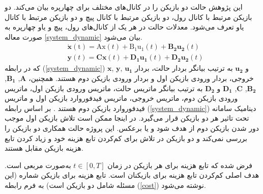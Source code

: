 \documentclass{CCI2020}
\begin{document}
این پژوهش حالت دو بازیکن را  در کانال‌های مختلف برای چهارپره بیان می‌کند. دو بازیکن مرتبط با کانال رول، دو بازیکن مرتبط با کانال پیچ و دو بازیکن مرتبط با کانال یاو تعرف می‌شود. معدلات حالت در هر یک از کانال‌های رول، پیچ و یاو چهارپره به صورت معاله \eqref{system_dynamic} بیان می‌شود.
\begin{equation}\label{system_dynamic}
	\begin{split}
		&\mathrm{\boldsymbol{\dot x}(t)} = \boldsymbol{\mathrm{Ax}}(t) + \boldsymbol{\mathrm{B_1u_1}}(t) + \boldsymbol{B_2u_2}(t) %
		\\
		&\boldsymbol{y}(t) = \boldsymbol{Cx}(t) + \boldsymbol{D_1u_1}(t) + \boldsymbol{D_2u_2}(t)
	\end{split}
\end{equation}
که در رابطه (\ref{system_dynamic})
$\boldsymbol x$, $\boldsymbol y$, $\boldsymbol{u_1}$
و
$\boldsymbol{u_2}$
به ترتیب بیانگر بردار حالت، بردار خروجی، بردار ورودی بازیکن اول و بردار ورودی بازیکن دوم هستند. همچنین، 
$\boldsymbol A$, $\boldsymbol{B_1}$, $\boldsymbol {B_2}$, $\boldsymbol C$, $\boldsymbol {D_1}$
و
$\boldsymbol{D_2}$
به ترتیب بیانگر ماتریس حالت، ماتریس ورودی بازیکن اول، ماتریس ورودی بازیکن دوم، ماتریس خروجی، ماتریس فیدفوروارد بازیکن اول و ماتریس فیدفوروارد بازیکن دوم هستند
\cite{mct}.
بر اساس رابطه (\ref{system_dynamic}) دینامیک سامانه تحت تاثیر هر دو بازیکن قرار می‌گیرد. در اینجا ممکن است تلاش  بازیکن اول موجب دور شدن بازیکن دوم از هدف شود و یا برعکس.  این پروژه حالت همکاری دو بازیکن را بررسی نمی‌کند و دو بازیکن در تلاش برای کم‌کردن تابع هزینه خود و زیاد کردن تابع هزینه بازیکن مقابل هستند.


فرض شده  که تابع هزینه برای هر بازیکن در زمان $t \in [0, T]$ به‌صورت مربعی است.
هدف اصلی کم‌کردن تابع هزینه برای بازیکنان است. تابع هزینه برای بازیکن شماره   (این مسئله شامل دو بازیکن است) به فرم رابطه (\ref{cost}) نوشته می‌شود.
\end{document}
